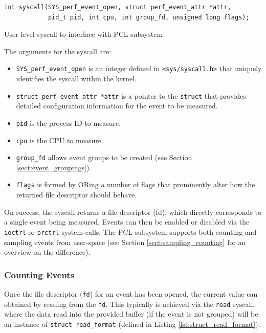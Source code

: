 \begin{listing}
    \begin{verbatim}
int syscall(SYS_perf_event_open, struct perf_event_attr *attr,
            pid_t pid, int cpu, int group_fd, unsigned long flags);
    \end{verbatim}
    \caption{User-level syscall to interface with PCL subsystem}
    \label{lst:perf_events_open_syscall}
\end{listing}

The arguments for the syscall are:
\ssp\begin{itemize}
    \item \texttt{SYS\_perf\_event\_open} is an integer defined in \texttt{<sys/syscall.h>} that uniquely identifies the syscall within the kernel.
    \item \texttt{struct perf\_event\_attr *attr} is a pointer to the \texttt{struct} that provides detailed configuration information for the event to be measured. 
    \item \texttt{pid} is the process ID to measure.
    \item \texttt{cpu} is the CPU to measure.
    \item \texttt{group\_fd} allows event groups to be created (see Section \ref{sect:event_groupings}).
    \item \texttt{flags} is formed by ORing a number of flags that prominently alter how the returned file descriptor should behave.
\end{itemize}\dsp

On success, the syscall returns a file descriptor (fd), which directly corresponds to a single event being measured. Events can then be enabled or disabled via the \texttt{ioctrl} or \texttt{prctrl} system calls. The PCL subsystem supports both counting and sampling events from user-space (see Section \ref{sect:sampling_counting} for an overview on the difference). 

\subsubsection{Counting Events}

Once the file descriptor (\texttt{fd}) for an event has been opened, the current value can obtained by reading from the \texttt{fd}. This typically is achieved via the \texttt{read} syscall, where the data read into the provided buffer (if the event is not grouped) will be an instance of \texttt{struct read\_format} (defined in Listing \ref{lst:struct_read_format}).

